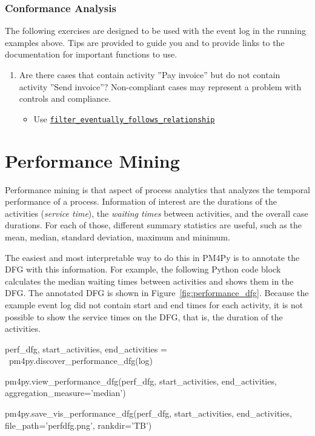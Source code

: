 \begin{exercisebox}
\subsubsection*{Conformance Analysis}

The following exercises are designed to be used with the event log in the running examples above. Tips are provided to guide you and to provide links to the documentation for important functions to use.

\begin{enumerate}
   \item Are there cases that contain activity ''Pay invoice'' but do not contain activity ''Send invoice''? Non-compliant cases may represent a problem with controls and compliance.
   \begin{itemize}
      \item Use \href{https://processintelligence.solutions/static/api/2.7.11/generated/pm4py.filtering.filter_eventually_follows_relation.html}{\texttt{filter\_eventually\_follows\_relationship}}
   \end{itemize}
\end{enumerate}
\end{exercisebox}

\section{Performance Mining}

Performance mining is that aspect of process analytics that analyzes the temporal performance of a process. Information of interest are the durations of the activities (\emph{service time}), the \emph{waiting times} between activities, and the overall case durations. For each of those, different summary statistics are useful, such as the mean, median, standard deviation, maximum and minimum. 

The easiest and most interpretable way to do this in PM4Py is to annotate the DFG with this information. For example, the following Python code block calculates the median waiting times between activities and shows them in the DFG. The annotated DFG is shown in Figure~\ref{fig:performance_dfg}. Because the example event log did not contain start and end times for each activity, it is not possible to show the service times on the DFG, that is, the duration of the activities.

\begin{pythoncode}
perf_dfg, start_activities, end_activities = \
    pm4py.discover_performance_dfg(log)
    
pm4py.view_performance_dfg(perf_dfg, 
    start_activities, end_activities, 
    aggregation_measure='median')

pm4py.save_vis_performance_dfg(perf_dfg, 
    start_activities, end_activities, 
    file_path='perfdfg.png', rankdir='TB')
\end{pythoncode}

